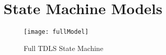 \chapter{State Machine Models}\label{appendix:a}

\begin{figure}[!h]
	\centering
	\texttt{[image: fullModel]}
	\caption{Full TDLS State Machine}
	\label{fig:tdls-sm-full}
\end{figure}

